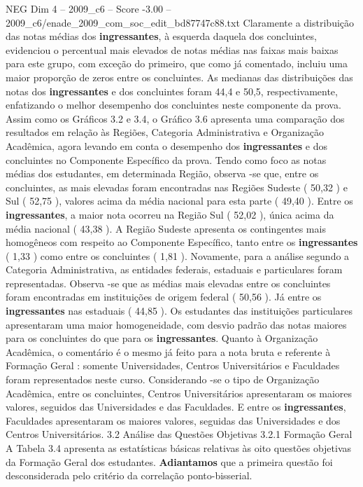 \begin{textsample}{NEG Dim 4 – 2009\_c6 – Score -3.00 – 2009\_c6/enade\_2009\_com\_soc\_edit\_bd87747c88.txt}
Claramente a distribuição das notas médias dos \textbf{ingressantes}, à esquerda daquela dos concluintes, evidenciou o percentual mais elevados de notas médias nas faixas mais baixas para este grupo, com exceção do primeiro, que como já comentado, incluiu uma maior proporção de zeros entre os concluintes.
As medianas das distribuições das notas dos \textbf{ingressantes} e dos concluintes foram 44,4 e 50,5, respectivamente, enfatizando o melhor desempenho dos concluintes neste componente da prova.
Assim como os Gráficos 3.2 e 3.4, o Gráfico 3.6 apresenta uma comparação dos resultados em relação às Regiões, Categoria Administrativa e Organização Acadêmica, agora levando em conta o desempenho dos \textbf{ingressantes} e dos concluintes no Componente Específico da prova.
Tendo como foco as notas médias dos estudantes, em determinada Região, observa -se que, entre os concluintes, as mais elevadas foram encontradas nas Regiões Sudeste ( 50,32 ) e Sul ( 52,75 ), valores acima da média nacional para esta parte ( 49,40 ).
Entre os \textbf{ingressantes}, a maior nota ocorreu na Região Sul ( 52,02 ), única acima da média nacional ( 43,38 ).
A Região Sudeste apresenta os contingentes mais homogêneos com respeito ao Componente Específico, tanto entre os \textbf{ingressantes} ( 1,33 ) como entre os concluintes ( 1,81 ).
Novamente, para a análise segundo a Categoria Administrativa, as entidades federais, estaduais e particulares foram representadas.
Observa -se que as médias mais elevadas entre os concluintes foram encontradas em instituições de origem federal ( 50,56 ).
Já entre os \textbf{ingressantes} nas estaduais ( 44,85 ).
Os estudantes das instituições particulares apresentaram uma maior homogeneidade, com desvio padrão das notas maiores para os concluintes do que para os \textbf{ingressantes}.
Quanto à Organização Acadêmica, o comentário é o mesmo já feito para a nota bruta e referente à Formação Geral : somente Universidades, Centros Universitários e Faculdades foram representados neste curso.
Considerando -se o tipo de Organização Acadêmica, entre os concluintes, Centros Universitários apresentaram os maiores valores, seguidos das Universidades e das Faculdades.
E entre os \textbf{ingressantes}, Faculdades apresentaram os maiores valores, seguidas das Universidades e dos Centros Universitários. 3.2 Análise das Questões Objetivas 3.2.1 Formação Geral A Tabela 3.4 apresenta as estatísticas básicas relativas às oito questões objetivas da Formação Geral dos estudantes. \textbf{Adiantamos} que a primeira questão foi desconsiderada pelo critério da correlação ponto-bisserial.

\end{textsample}
